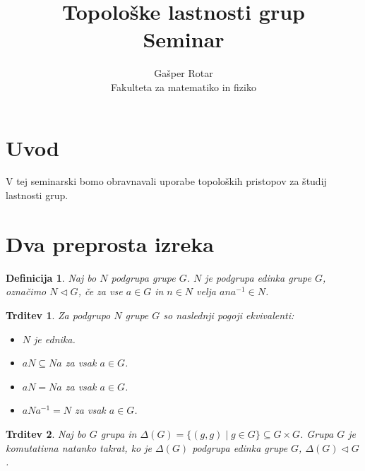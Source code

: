 \documentclass[a4paper,12pt]{article}
\title{Topološke lastnosti grup \\ 
\Large Seminar}
\author{Gašper Rotar \\
Fakulteta za matematiko in fiziko}
\newtheorem{trditev}{Trditev}
\newtheorem{definicija}{Definicija}
\begin{document}
\maketitle

\section{Uvod}

V tej seminarski bomo obravnavali uporabe topoloških pristopov za študij lastnosti grup.



\section{Dva preprosta izreka}

\begin{definicija}
    Naj bo $N$ podgrupa grupe $G$. $N$ je podgrupa edinka grupe $G$, označimo $N \triangleleft G$, če za vse $a \in G$ in $n \in N$ velja $ana^{-1} \in N$.
\end{definicija}

\begin{trditev}
    Za podgrupo $N$ grupe $G$ so naslednji pogoji ekvivalenti:
    \begin{itemize}
    \item[\rm (i)] $N$ je ednika.
    \item[\rm (ii)] $aN \subseteq Na$ za vsak $a \in G$.
    \item[\rm (iii)] $aN = Na$ za vsak $a \in G$.
    \item[\rm (iv)] $aNa^{-1} = N$ za vsak $a \in G$. 
    \end{itemize}
\end{trditev}

\begin{trditev}
    Naj bo $G$ grupa in $\Delta(G) = \{(g,g) \mid g \in G \} \subseteq G \times G$.
    Grupa $G$ je komutativna natanko takrat, ko je $\Delta(G)$ podgrupa edinka grupe $G$, $\Delta(G) \triangleleft G$.
\end{trditev}
\end{document}
